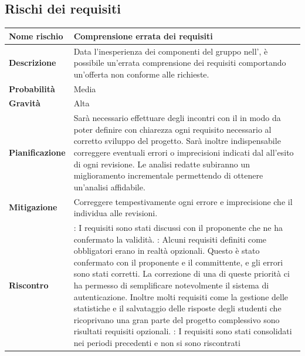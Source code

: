 \documentclass[12pt,a4paper]{article}
\begin{document}
\subsection{Rischi dei requisiti}

\begin{table}[H]
	\begin{center}
		\begin{tabular}{p{} p{}}
			\toprule
			\textbf{Nome rischio} & \textbf{Comprensione errata dei requisiti} \\
			\midrule
			\midrule
			\textbf{Descrizione} & Data l’inesperienza dei componenti del gruppo nell’\AdR{}, è possibile un’errata comprensione dei requisiti comportando un’offerta non conforme alle richieste. \\
			\midrule
			\textbf{Probabilità} & Media \\
			\midrule
			\textbf{Gravità} & Alta \\
			\midrule
			\textbf{Pianificazione} &  Sarà necessario effettuare degli incontri con il \mgls{proponente} in modo da poter definire con chiarezza ogni requisito necessario al corretto sviluppo del progetto. Sarà inoltre indispensabile correggere eventuali errori o imprecisioni indicati dal \mgls{committente} all’esito di ogni revisione. Le analisi redatte subiranno un miglioramento incrementale permettendo di ottenere un’analisi affidabile. \\
			\midrule
			\textbf{Mitigazione} & Correggere tempestivamente ogni errore e imprecisione che il \mgls{committente} individua alle revisioni. \\
            \midrule
            \textbf{Riscontro} & 
                \textbf{\FA{}}: I requisiti sono stati discussi con il proponente che ne ha confermato la 
                    validità. \newline
                \textbf{\FAD{}}: Alcuni requisiti definiti come obbligatori erano in realtà opzionali.
                    Questo è stato confermato con il proponente e il committente, e gli errori sono stati corretti.
                    La correzione di una di queste priorità ci ha permesso di semplificare notevolmente
                    il sistema di autenticazione. Inoltre molti requisiti come la gestione delle statistiche
                    e il salvataggio delle risposte degli studenti che ricoprivano una gran parte del progetto
                    complessivo sono risultati requisiti opzionali. \newline
                \textbf{\FPA{}}: I requisiti sono stati consolidati nei periodi precedenti e non si sono riscontrati

\end{tabular}
\end{center}
\end{table}
\end{document}
